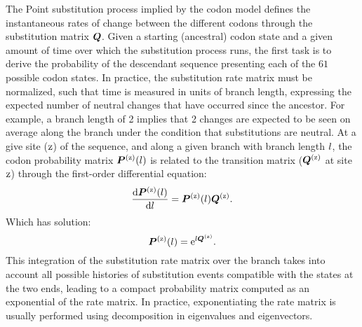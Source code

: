The Point substitution process implied by the codon model defines the instantaneous rates of change between the different codons through the substitution matrix $\bm{Q}$.
Given a starting (ancestral) codon state and a given amount of time over which the substitution process runs, the first task is to derive the probability of the descendant sequence presenting each of the $61$ possible codon states.
In practice, the substitution rate matrix must be normalized, such that time is measured in units of branch length, expressing the expected number of neutral changes that have occurred since the ancestor.
For example, a branch length of 2 implies that 2 changes are expected to be seen on average along the branch under the condition that substitutions are neutral.
At a give site ($\text{z}$) of the sequence, and along a given branch with branch length $l$, the codon probability matrix $\bm{P}^{(\text{z})}(l)$ is related to the transition matrix ($\bm{Q}^{(\text{z})}$ at site $\text{z}$) through the first-order differential equation:
\begin{equation}
    \dfrac{\mathrm{d} \bm{P}^{(\text{z})}(l)}{\mathrm{d} l} = \bm{P}^{(\text{z})}(l) \bm{Q}^{(\text{z})}.
\end{equation}
Which has solution:
\begin{equation}
    \bm{P}^{(\text{z})}(l) = \mathrm{e}^{l \bm{Q}^{(\text{z})}}.
\end{equation}
This integration of the substitution rate matrix over the branch takes into account all possible histories of substitution events compatible with the states at the two ends, leading to a compact probability matrix computed as an exponential of the rate matrix.
In practice, exponentiating the rate matrix is usually performed using decomposition in eigenvalues and eigenvectors.

